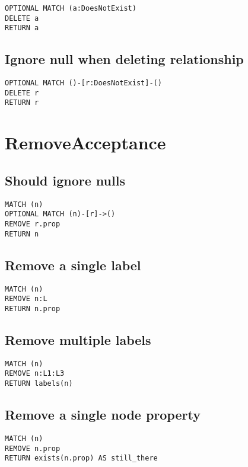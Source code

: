 \begin{lstlisting}
OPTIONAL MATCH (a:DoesNotExist)
DELETE a
RETURN a
\end{lstlisting}

\subsection{Ignore null when deleting relationship}

\begin{lstlisting}
OPTIONAL MATCH ()-[r:DoesNotExist]-()
DELETE r
RETURN r
\end{lstlisting}
\section{RemoveAcceptance}


\subsection{Should ignore nulls}

\begin{lstlisting}
MATCH (n)
OPTIONAL MATCH (n)-[r]->()
REMOVE r.prop
RETURN n
\end{lstlisting}

\subsection{Remove a single label}

\begin{lstlisting}
MATCH (n)
REMOVE n:L
RETURN n.prop
\end{lstlisting}

\subsection{Remove multiple labels}

\begin{lstlisting}
MATCH (n)
REMOVE n:L1:L3
RETURN labels(n)
\end{lstlisting}

\subsection{Remove a single node property}

\begin{lstlisting}
MATCH (n)
REMOVE n.prop
RETURN exists(n.prop) AS still_there
\end{lstlisting}

